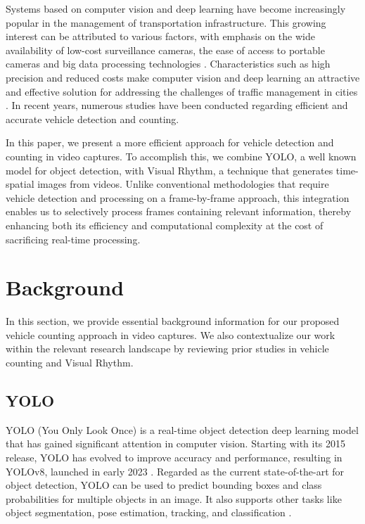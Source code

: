 \documentclass[10pt,conference]{IEEEtran}
\begin{document}
Systems based on computer vision and deep learning have become increasingly popular in the management of transportation infrastructure. This growing interest can be attributed to various factors, with emphasis on the wide availability of low-cost surveillance cameras, the ease of access to portable cameras and big data processing technologies \cite{Correlation}. Characteristics such as high precision and reduced costs make computer vision and deep learning an attractive and effective solution for addressing the challenges of traffic management in cities \cite{AplicationsDL}. In recent years, numerous studies have been conducted regarding efficient and accurate vehicle detection and counting.

In this paper, we present a more efficient approach for vehicle detection and counting in video captures. To accomplish this, we combine YOLO, a well known model for object detection, with Visual Rhythm, a technique that generates time-spatial images from videos. Unlike conventional methodologies that require vehicle detection and processing on a frame-by-frame approach, this integration enables us to selectively process frames containing relevant information, thereby enhancing both its efficiency and computational complexity at the cost of sacrificing real-time processing. 

\section{Background}
\label{sec-bg}
In this section, we provide essential background information for our proposed vehicle counting approach in video captures. We also contextualize our work within the relevant research landscape by reviewing prior studies in vehicle counting and Visual Rhythm.

\subsection{YOLO}
YOLO (You Only Look Once) is a real-time object detection %
deep learning model that has gained significant attention in computer vision. Starting with its 2015 release, YOLO has evolved to improve accuracy and performance, resulting in YOLOv8, launched in early 2023 \cite{yolo-v1 , yolo-evo}. Regarded as the current state-of-the-art for object detection, YOLO can be used to predict bounding boxes and class probabilities for multiple objects in an image. It also supports other tasks like object segmentation, pose estimation, tracking, and classification \cite{v8-github}.
\end{document}
